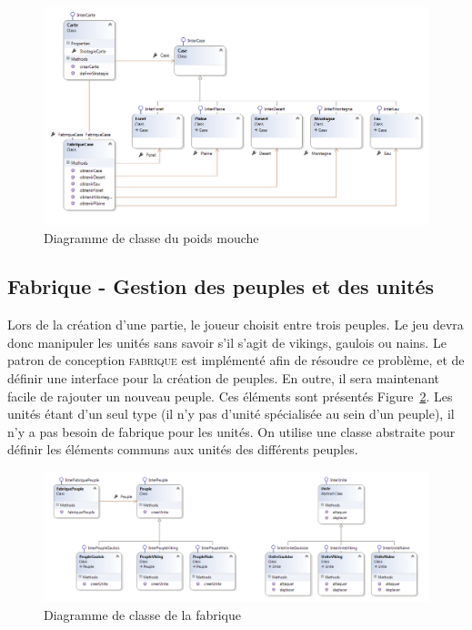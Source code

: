 \documentclass[a4paper]{article}%
\begin{document}
\begin{figure}[H]
    \centering
    \includegraphics[width=\textwidth]{./images/classe/poidsmouche.png}
		\caption{Diagramme de classe du poids mouche}
		\label{fig:class_poidsmouche}
\end{figure}

\subsection{Fabrique - Gestion des peuples et des unités}

Lors de la création d'une partie, le joueur choisit entre trois peuples. Le jeu devra donc manipuler les unités sans savoir s'il s'agit de vikings, gaulois ou nains. Le patron de conception \textsc{fabrique} est implémenté afin de résoudre ce problème, et de définir une interface pour la création de peuples. En outre, il sera maintenant facile de rajouter un nouveau peuple. Ces éléments sont présentés Figure~\ref{fig:class_fabrique}.
Les unités étant d'un seul type (il n'y pas d'unité spécialisée au sein d'un peuple), il n'y a pas besoin de fabrique pour les unités. On utilise une classe abstraite pour définir les éléments communs aux unités des différents peuples. 

\begin{figure}[H]
    \centering
    \includegraphics[width=\textwidth]{./images/classe/fabrique.png}
		\caption{Diagramme de classe de la fabrique}
		\label{fig:class_fabrique}
\end{figure}
\end{document}
